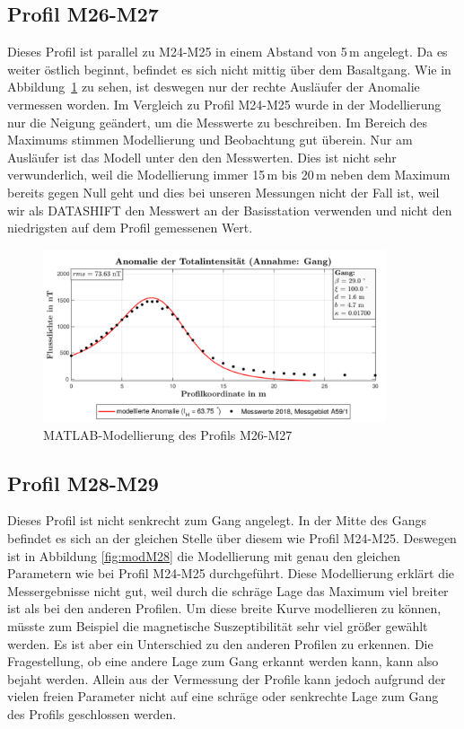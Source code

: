 \subsection{Profil M26-M27}

Dieses Profil ist parallel zu M24-M25 in einem Abstand von 5\,m angelegt. Da es weiter östlich beginnt, befindet es sich nicht mittig über dem Basaltgang. Wie in Abbildung~\ref{fig:modM26} zu sehen, ist deswegen nur der rechte Ausläufer der Anomalie vermessen worden. Im Vergleich zu Profil M24-M25 wurde in der Modellierung nur die Neigung geändert, um die Messwerte zu beschreiben. Im Bereich des Maximums stimmen Modellierung und Beobachtung gut überein. Nur am Ausläufer ist das Modell unter den den Messwerten. Dies ist nicht sehr verwunderlich, weil die Modellierung immer 15\,m bis 20\,m neben dem Maximum bereits gegen Null geht und dies bei unseren Messungen nicht der Fall ist, weil wir als DATASHIFT den Messwert an der Basisstation verwenden und nicht den niedrigsten auf dem Profil gemessenen Wert.

\begin{figure}
 \centering
 \includegraphics[width=0.9\textwidth]{fig/modM26}
 \caption{MATLAB-Modellierung des Profils M26-M27}
 \label{fig:modM26}
\end{figure}

\subsection{Profil M28-M29}

Dieses Profil ist nicht senkrecht zum Gang angelegt. In der Mitte des Gangs befindet es sich an der gleichen Stelle über diesem wie Profil M24-M25. Deswegen ist in Abbildung \ref{fig:modM28} die Modellierung mit genau den gleichen Parametern wie bei Profil M24-M25 durchgeführt. Diese Modellierung erklärt die Messergebnisse nicht gut, weil durch die schräge Lage das Maximum viel breiter ist als bei den anderen Profilen. Um diese breite Kurve modellieren zu können, müsste zum Beispiel die magnetische Suszeptibilität sehr viel größer gewählt werden. Es ist aber ein Unterschied zu den anderen Profilen zu erkennen. Die Fragestellung, ob eine andere Lage zum Gang erkannt werden kann, kann also bejaht werden. Allein aus der Vermessung der Profile kann jedoch aufgrund der vielen freien Parameter nicht auf eine schräge oder senkrechte Lage zum Gang des Profils geschlossen werden.

